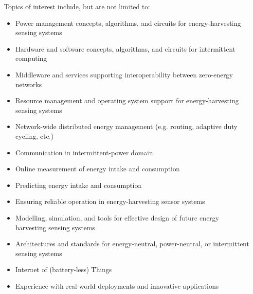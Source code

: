 \documentclass[a4paper,10pt]{scrartcl}
\begin{document}
\begin{minipage}{.49\textwidth}
  Topics of interest include, but are not limited to:
  \vskip1mm
  \begin{itemize}[leftmargin=5mm,nolistsep]
    \item Power management concepts, algorithms, and circuits for energy-harvesting sensing systems
    \item Hardware and software concepts, algorithms, and circuits for intermittent computing
    \item Middleware and services supporting interoperability between zero-energy networks
    \item Resource management and operating system support for energy-harvesting sensing systems
    \item Network-wide distributed energy management (e.g. routing, adaptive duty cycling, etc.)
    \item Communication in intermittent-power domain
    \item Online measurement of energy intake and consumption
    \item Predicting energy intake and consumption
    \item Ensuring reliable operation in energy-harvesting sensor systems
    \item Modelling, simulation, and tools for effective design of future energy harvesting sensing systems 
    \item Architectures and standards for energy-neutral, power-neutral, or intermittent sensing systems
    \item Internet of (battery-less) Things
    \item Experience with real-world deployments and innovative applications
  \end{itemize}
\end{minipage}

\vskip4mm
\end{document}
